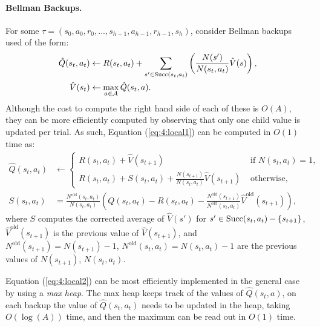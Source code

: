         \newcommand{\old}{{\text{old}}}
        \newcommand{\Qcorrected}{{S}}

        \paragraph{Bellman Backups.} For some $\tau=(s_0,a_0,r_0,...,s_{h-1},a_{h-1},r_{h-1},s_h)$, consider Bellman backups used of the form:
        \begin{align}
            \hat{Q}(s_t,a_t) &\leftarrow 
                R(s_t,a_t) + \sum_{s' \in {\textnormal{Succ}(s_t,a_t)}} \left( \frac{N(s')}{N(s_t,a_t)} \hat{V}(s) \right), 
                    \label{eq:4:local1} \\ 
            \hat{V}(s_t) &\leftarrow \max_{a\in\mathcal{A}} \hat{Q}(s_t,a). \label{eq:4:local2}
        \end{align}
        Although the cost to compute the right hand side of each of these is $O(A)$, they can be more efficiently computed by observing that only one child value is updated per trial. As such, Equation (\ref{eq:4:local1}) can be computed in $O(1)$ time as:
        \begin{align}
            \hat{Q}(s_t,a_t) &\leftarrow \begin{cases}
                R(s_t,a_t) + \hat{V}(s_{t+1}) & \text{ if } N(s_t,a_t) = 1, \\
                R(s_t,a_t)  
                    + \Qcorrected(s_t,a_t)
                    + \frac{N(s_{t+1})}{N(s_t,a_t)}\hat{V}(s_{t+1}) & \text{ otherwise,}
            \end{cases} \\
            \Qcorrected(s_t,a_t) &= 
                \frac{N^{\old}(s_t,a_t)}{N(s_t,a_t)} \left( Q(s_t,a_t) - R(s_t,a_t) 
                    - \frac{N^{\old}(s_{t+1})}{N^{\old}(s_t,a_t)} \hat{V}^{\old}(s_{t+1}) \right),
        \end{align}
        where $S$ computes the corrected average of $\hat{V}(s')$ for $s'\in{\textnormal{Succ}(s_t,a_t)}-\{s_{t+1}\}$, $\hat{V}^{\old}(s_{t+1})$ is the previous value of $\hat{V}(s_{t+1})$, and $N^{\old}(s_{t+1}) = N(s_{t+1})-1$, $N^{\old}(s_t,a_t) = N(s_t,a_t)-1$ are the previous values of $N(s_{t+1})$, $N(s_t,a_t)$.

        Equation (\ref{eq:4:local2}) can be most efficiently implemented in the general case by using a \textit{max heap}. The max heap keeps track of the values of $\hat{Q}(s_t,a)$, on each backup the value of $\hat{Q}(s_t,a_t)$ needs to be updated in the heap, taking $O(\log(A))$ time, and then the maximum can be read out in $O(1)$ time. 
        
